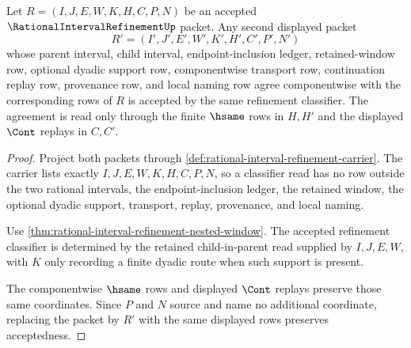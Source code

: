 \begin{theorem}
\label{thm:rational-interval-refinement-classifier-stability}
Let $R=(I,J,E,W,K,H,C,P,N)$ be an accepted $\RationalIntervalRefinementUp$ packet. Any second displayed packet
$$
R'=(I',J',E',W',K',H',C',P',N')
$$
whose parent interval, child interval, endpoint-inclusion ledger, retained-window row, optional dyadic support row, componentwise transport row, continuation replay row, provenance row, and local naming row agree componentwise with the corresponding rows of $R$ is accepted by the same refinement classifier. The agreement is read only through the finite $\hsame$ rows in $H,H'$ and the displayed $\Cont$ replays in $C,C'$.
\end{theorem}
\begin{proof}
Project both packets through \autoref{def:rational-interval-refinement-carrier}. The carrier lists exactly $I,J,E,W,K,H,C,P,N$, so a classifier read has no row outside the two rational intervals, the endpoint-inclusion ledger, the retained window, the optional dyadic support, transport, replay, provenance, and local naming.

Use \autoref{thm:rational-interval-refinement-nested-window}. The accepted refinement classifier is determined by the retained child-in-parent read supplied by $I,J,E,W$, with $K$ only recording a finite dyadic route when such support is present.

The componentwise $\hsame$ rows and displayed $\Cont$ replays preserve those same coordinates. Since $P$ and $N$ source and name no additional coordinate, replacing the packet by $R'$ with the same displayed rows preserves acceptedness.
\end{proof}

